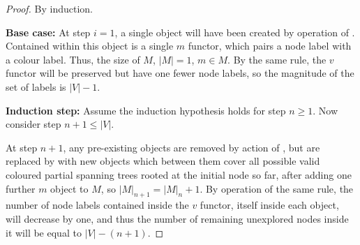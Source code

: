 \begin{proof}
By induction.

\textbf{Base case:}
At step \(i = 1\), a single \bo{} object will have been created by operation of .  Contained within this \bo{} object is a single \(m\) \gls{functor}, which pairs a node label with a colour label.  Thus, the size of \(M\), \(|M| = 1\), \(m \in M\).  By the same rule, the \(v\) \gls{functor} will be preserved but have one fewer node labels, so the magnitude of the set of labels is \(|V| - 1\).

\textbf{Induction step:}
Assume the induction hypothesis holds for step \(n \geq 1\).  Now consider step \(n + 1 \leq |V|\).


At step \(n + 1\), any pre-existing \bo{} objects are removed by action of , but are replaced by  with new \bo{} objects which between them cover all possible valid coloured partial spanning trees rooted at the initial node so far, after adding one further \(m\) object to \(M\), so \(|M|_{n + 1} = |M|_{n} + 1\).  By operation of the same rule, the number of node labels contained inside the \(v\) \gls{functor}, itself inside each \bo{} object, will decrease by one, and thus the number of remaining unexplored nodes inside it will be equal to \(|V| - (n + 1)\).


\end{proof}
